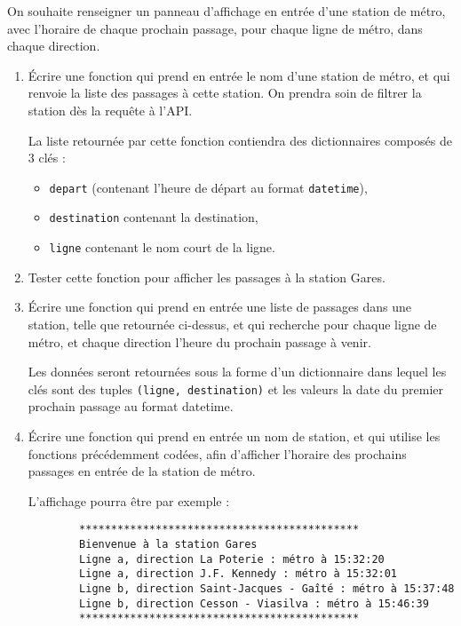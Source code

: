 \documentclass[11pt,a4paper]{article}
\begin{document}
On souhaite renseigner un panneau d'affichage en entrée d'une station de métro, avec l'horaire de chaque prochain passage, pour chaque ligne de métro, dans chaque direction. 

\begin{enumerate}
    \item Écrire une fonction qui prend en entrée le nom d'une station de métro, et qui renvoie la liste des passages à cette station. On prendra soin de filtrer la station dès la requête à l'API.

    La liste retournée par cette fonction contiendra des dictionnaires composés de 3 clés : 
    \begin{itemize}
        \item \verb+depart+ (contenant l'heure de départ au format \verb+datetime+), 
        \item \verb+destination+ contenant la destination,
       \item \verb+ligne+ contenant le nom court de la ligne.
    \end{itemize}
    \item Tester cette fonction pour afficher les passages à la station Gares.
    \item Écrire une fonction qui prend en entrée une liste de passages dans une station, telle que retournée ci-dessus, et qui recherche pour chaque ligne de métro, et chaque direction l'heure du prochain passage à venir. 
    
    Les données seront retournées sous la forme d'un dictionnaire dans lequel les clés sont des tuples \verb+(ligne, destination)+ et les valeurs la date du premier prochain passage au format datetime. 

    \item Écrire une fonction qui prend en entrée un nom de station, et qui utilise les fonctions précédemment codées, afin d'afficher l'horaire des prochains passages en entrée de la station de métro. 
    
    L'affichage pourra être par exemple : 
    \begin{verbatim}
        ********************************************
        Bienvenue à la station Gares
        Ligne a, direction La Poterie : métro à 15:32:20
        Ligne a, direction J.F. Kennedy : métro à 15:32:01
        Ligne b, direction Saint-Jacques - Gaîté : métro à 15:37:48
        Ligne b, direction Cesson - Viasilva : métro à 15:46:39
        ********************************************
\end{verbatim}
\end{enumerate}
\end{document}
